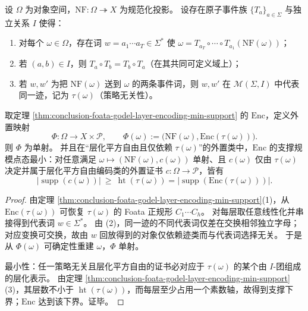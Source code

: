 \begin{theorem}\label{thm:conclusion-strategy-invariant-trace-externalization-minimality}
设 \(\Omega\) 为对象空间，\(\mathrm{NF}:\Omega\twoheadrightarrow X\) 为规范化投影。
设存在原子事件族 \(\{T_a\}_{a\in\Sigma}\) 与独立关系 \(I\) 使得：
\begin{enumerate}
  \item 对每个 \(\omega\in\Omega\)，存在词 \(w=a_1\cdots a_T\in\Sigma^\ast\) 使
  \(
  \omega=T_{a_T}\circ\cdots\circ T_{a_1}(\mathrm{NF}(\omega))
  \)；
  \item 若 \((a,b)\in I\)，则 \(T_a\circ T_b=T_b\circ T_a\)（在其共同可定义域上）；
  \item 若 \(w,w'\) 为把 \(\mathrm{NF}(\omega)\) 送到 \(\omega\) 的两条事件词，则 \(w,w'\) 在 \(\mathcal M(\Sigma,I)\) 中代表同一迹，记为 \(\tau(\omega)\)（策略无关性）。
\end{enumerate}
取定理 \ref{thm:conclusion-foata-godel-layer-encoding-min-support} 的 \(\mathrm{Enc}\)，定义外置映射
\[
\Phi:\Omega\to X\times\mathcal P,
\qquad
\Phi(\omega):=\bigl(\mathrm{NF}(\omega),\mathrm{Enc}(\tau(\omega))\bigr).
\]
则 \(\Phi\) 为单射。
并且在“层化平方自由且仅依赖 \(\tau(\omega)\)”的外置类中，\(\mathrm{Enc}\) 的支撑规模点态最小：对任意满足
\(\omega\mapsto(\mathrm{NF}(\omega),c(\omega))\) 单射、且 \(c(\omega)\) 仅由 \(\tau(\omega)\) 决定并属于层化平方自由编码类的外置证书 \(c:\Omega\to\mathcal P\)，皆有
\[
\bigl|\operatorname{supp}(c(\omega))\bigr|\ \ge\ \operatorname{ht}(\tau(\omega))
=\bigl|\operatorname{supp}(\mathrm{Enc}(\tau(\omega)))\bigr|.
\]
\end{theorem}
\begin{proof}
由定理 \ref{thm:conclusion-foata-godel-layer-encoding-min-support}(1)，从 \(\mathrm{Enc}(\tau(\omega))\) 可恢复 \(\tau(\omega)\) 的 Foata 正规形 \(C_1\cdots C_h\)。
对每层取任意线性化并串接得到代表词 \(w\in\Sigma^\ast\)。
由 (2)，同一迹的不同代表词仅差在交换相邻独立字母；对应变换可交换，故由 \(w\) 回放得到的对象仅依赖迹类而与代表词选择无关。
于是从 \(\Phi(\omega)\) 可确定性重建 \(\omega\)，\(\Phi\) 单射。

最小性：任一策略无关且层化平方自由的证书必对应于 \(\tau(\omega)\) 的某个由 \(I\)-团组成的层化表示。
由定理 \ref{thm:conclusion-foata-godel-layer-encoding-min-support}(3)，其层数不小于 \(\operatorname{ht}(\tau(\omega))\)，而每层至少占用一个素数轴，故得到支撑下界；\(\mathrm{Enc}\) 达到该下界。证毕。
\end{proof}

